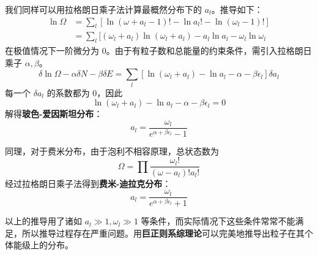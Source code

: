 我们同样可以用拉格朗日乘子法计算最概然分布下的 $a_l$。推导如下：
\begin{equation}
\begin{aligned}
\ln \Omega&=\sum_l[\ln (\omega+a_l-1)!-\ln a_l!-\ln (\omega_l-1)!]\\
&=\sum_l[(\omega_l+a_l)\ln(\omega_l+a_l)-a_l\ln a_l-\omega_l\ln \omega_l
\end{aligned}
\end{equation}
在极值情况下一阶微分为 $0$。由于有粒子数和总能量的约束条件，需引入拉格朗日乘子 $\alpha,\beta$。
\begin{equation}
\delta \ln \Omega-\alpha\delta N-\beta\delta E=\sum_l[\ln (\omega_l+a_l)-\ln a_l-\alpha-\beta\epsilon_l]\delta a_l
\end{equation}
每一个 $\delta a_l$ 的系数都为 $0$，因此
\begin{equation}
\ln(\omega_l+a_l)-\ln a_l-\alpha-\beta \epsilon_l=0
\end{equation}
解得\textbf{玻色-爱因斯坦分布}：
\begin{equation}\label{eq_MBsta_9}
a_l=\frac{\omega_l}{e^{\alpha+\beta\epsilon_l}-1}
\end{equation}

同理，对于费米分布，由于泡利不相容原理，总状态数为
\begin{equation}
\Omega=\prod \frac{\omega_l!}{(\omega-a_l)!a_l!}
\end{equation}
经过拉格朗日乘子法得到\textbf{费米-迪拉克分布}：
\begin{equation}
a_l=\frac{\omega_l}{e^{\alpha+\beta\epsilon_l}+1}
\end{equation}

以上的推导用了诸如 $a_l\gg 1,\omega_l\gg 1$ 等条件，而实际情况下这些条件常常不能满足，所以推导过程存在严重问题。用\textbf{巨正则系综理论}可以完美地推导出粒子在其个体能级上的分布。

